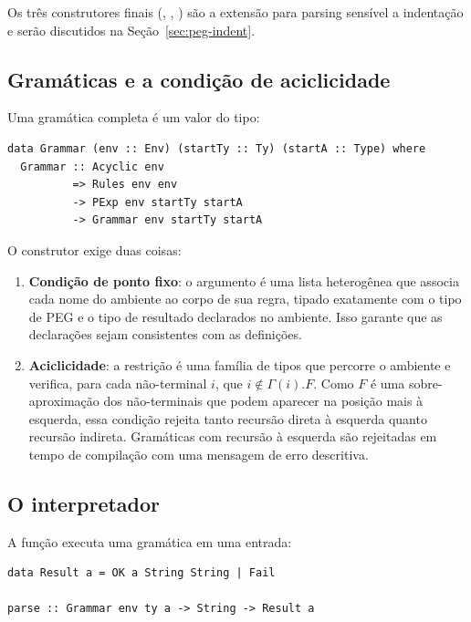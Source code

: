 Os três construtores finais (, ,
) são a extensão para parsing sensível a indentação e
serão discutidos na Seção~\ref{sec:peg-indent}.

\subsection{Gramáticas e a condição de aciclicidade}

Uma gramática completa é um valor do tipo:

\begin{verbatim}
data Grammar (env :: Env) (startTy :: Ty) (startA :: Type) where
  Grammar :: Acyclic env
          => Rules env env
          -> PExp env startTy startA
          -> Grammar env startTy startA
\end{verbatim}

O construtor  exige duas coisas:

\begin{enumerate}
  \item \textbf{Condição de ponto fixo}: o argumento 
    é uma lista heterogênea que associa cada nome do ambiente ao corpo
    de sua regra, tipado exatamente com o tipo de PEG e o tipo de
    resultado declarados no ambiente. Isso garante que as declarações
    sejam consistentes com as definições.

  \item \textbf{Aciclicidade}: a restrição  é uma
    família de tipos que percorre o ambiente e verifica, para cada
    não-terminal \(i\), que \(i \notin \Gamma(i).F\). Como \(F\) é
    uma sobre-aproximação dos não-terminais que podem aparecer na
    posição mais à esquerda, essa condição rejeita tanto recursão
    direta à esquerda quanto recursão indireta. Gramáticas com recursão
    à esquerda são rejeitadas em tempo de compilação com uma mensagem
    de erro descritiva.
\end{enumerate}

\subsection{O interpretador}

A função  executa uma gramática em uma entrada:

\begin{verbatim}
data Result a = OK a String String | Fail

parse :: Grammar env ty a -> String -> Result a
\end{verbatim}

